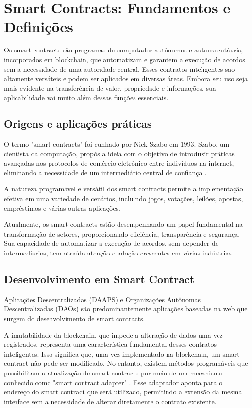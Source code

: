 \section{Smart Contracts: Fundamentos e Definições}

Os smart contracts são programas de computador autônomos e autoexecutáveis, incorporados em blockchain, que automatizam e garantem a execução de acordos sem a necessidade de uma autoridade central.
Esses contratos inteligentes são altamente versáteis e podem ser aplicados em diversas áreas. Embora seu uso seja mais evidente na transferência de valor, propriedade e informações, sua aplicabilidade vai muito além dessas funções essenciais.


\subsection{Origens e aplicações práticas}
O termo "smart contracts" foi cunhado por Nick Szabo em 1993. Szabo, um cientista da computação, propôs a ideia com o objetivo de introduzir práticas avançadas nos protocolos de comércio eletrônico entre indivíduos na internet, eliminando a necessidade de um intermediário central de confiança \cite{vector}. 

 A natureza programável e versátil dos smart contracts permite a implementação efetiva em uma variedade de cenários, incluindo jogos, votações, leilões, apostas, empréstimos e várias outras aplicações.

Atualmente, os smart contracts estão desempenhando um papel fundamental na transformação de setores, proporcionando eficiência, transparência e segurança. Sua capacidade de automatizar a execução de acordos, sem depender de intermediários, tem atraído atenção e adoção crescentes em várias indústrias.



\subsection{Desenvolvimento em Smart Contract}

Aplicações Descentralizadas (DAAPS) e Organizações Autônomas Descentralizadas (DAOs) são predominantemente aplicações baseadas na web que surgem do desenvolvimento de smart contracts. 

A imutabilidade da blockchain, que impede a alteração de dados uma vez registrados, representa uma característica fundamental desses contratos inteligentes. Isso significa que, uma vez implementado na blockchain, um smart contract não pode ser modificado. No entanto, existem métodos programáveis que possibilitam a atualização de smart contracts por meio de um mecanismo conhecido como "smart contract adapter"  \cite{atualizarSM}. Esse adaptador aponta para o endereço do smart contract que será utilizado, permitindo a extensão da mesma interface sem a necessidade de alterar diretamente o contrato existente.

